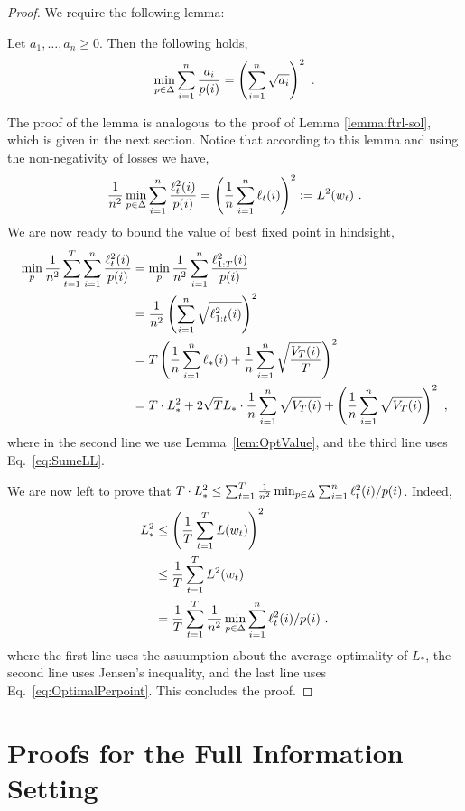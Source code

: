 \begin{proof}
We require the following lemma:
\begin{lemma}\label{lem:OptValue}
Let $a_1,\ldots,a_n\geq0$. Then the following holds,
$$
\min_{p\in\Delta}\sum_{i=1}^n\frac{a_i}{p(i)} =\left( \sum_{i=1}^n\sqrt{a_i}\right)^2~.
$$
\end{lemma}
The proof of the lemma is analogous to the proof of Lemma \ref{lemma:ftrl-sol}, which is given in the next section. Notice that according to this lemma and using the non-negativity of losses we have,
\begin{align} \label{eq:OptimalPerpoint}
\frac{1}{n^2}\min_{p\in\Delta}\sum_{i=1}^n \frac{\ell_t^2(i)}{p(i)} =\left(\frac{1}{n} \sum_{i=1}^n \ell_t(i) \right)^2:= L^2(w_t)~.
\end{align}
We are now ready to bound the value of best fixed point in hindsight,
\begin{align*}
\min_{p} \frac{1}{n^2}\sum_{t=1}^T \sum_{i=1}^n \frac{\ell_t^2(i)}{p(i)} 
& = 
\min_{p} \frac{1}{n^2}\sum_{i=1}^n \frac{\ell_{1:T}^2(i)}{p(i)} \\
& = 
 \frac{1}{n^2}\left( \sum_{i=1}^n  \sqrt{\ell^2_{1:t}(i)} \right)^2 \\
& = 
T \left( \frac{1}{n}\sum_{i=1}^n \ell_{*}(i) +\frac{1}{n}\sum_{i=1}^n  \sqrt{\frac{V_T(i)}{T}}  \right)^2 \\
 &=
 T \cdot L_*^2 + 2\sqrt{T}L_* \cdot \frac{1}{n}\sum_{i=1}^n  \sqrt{{V_T(i)}} + \left(\frac{1}{n}\sum_{i=1}^n  \sqrt{{V_T(i)}} \right)^2~,
\end{align*}
where in the second line we use Lemma~\ref{lem:OptValue}, and the third line uses Eq.~\eqref{eq:SumeLL}.

We are now left to prove that $T \cdot L_*^2\leq \sum_{t=1}^T \frac{1}{n^2}\min_{p\in\Delta}\sum_{i=1}^n {\ell_t^2(i)}/{p(i)} $. Indeed, \begin{align*}
  L_*^2 
  &\leq
 \left( \frac{1}{T}\sum_{t=1}^T L(w_t)\right)^2 \\
 &\leq
 \frac{1}{T}\sum_{t=1}^T L^2(w_t) \\
 &=
 \frac{1}{T}\sum_{t=1}^T  \frac{1}{n^2}\min_{p\in\Delta}\sum_{i=1}^n {\ell_t^2(i)}/{p(i)}~.
\end{align*}
where the first line uses the asuumption about the average optimality of $L_*$, the second line uses Jensen's inequality, and the last line uses Eq.~\eqref{eq:OptimalPerpoint}. 
This concludes the proof.
\end{proof}



\section{Proofs for the Full Information Setting }

